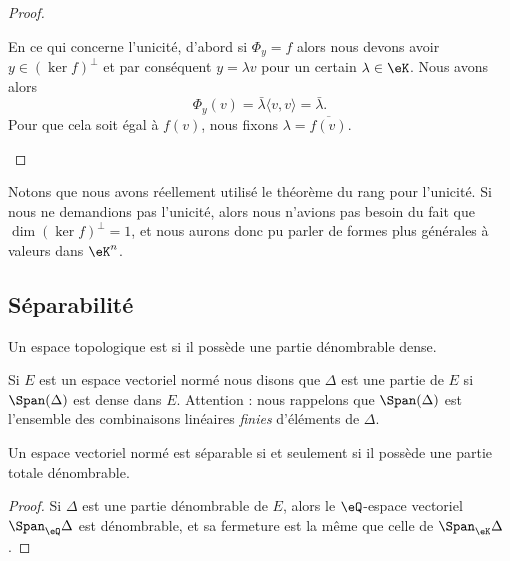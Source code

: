 \begin{proof}
\begin{subproof}
		\spitem[Unicité]

		En ce qui concerne l'unicité, d'abord si \(  \Phi_y= f\) alors nous devons avoir \( y\in(\ker f)^{\perp}\) et par conséquent \( y=\lambda v\) pour un certain \( \lambda\in \eK\). Nous avons alors
		\begin{equation}
			\Phi_y(v)=\bar\lambda\langle v, v\rangle =\bar\lambda.
		\end{equation}
		Pour que cela soit égal à \(  f(v)\), nous fixons \( \lambda=\overline{  f(v) }\).
	\end{subproof}
\end{proof}
Notons que nous avons réellement utilisé le théorème du rang pour l'unicité. Si nous ne demandions pas l'unicité, alors nous n'avions pas besoin du fait que \( \dim(\ker f)^{\perp}=1\), et nous aurons donc pu parler de formes plus générales à valeurs dans \( \eK^n\).

\subsection{Séparabilité}

\begin{definition}      \label{DEFooSFOJooGICSbT}
	Un espace topologique est  si il possède une partie dénombrable dense.
\end{definition}

\begin{definition}      \label{DEFooQVPHooJaSWyF}
	Si \( E\) est un espace vectoriel normé nous disons que \( \Delta\) est une partie  de \( E\) si \( \Span(\Delta)\) est dense dans \( E\). Attention : nous rappelons que \( \Span(\Delta)\) est l'ensemble des combinaisons linéaires \emph{finies} d'éléments de \( \Delta\).
\end{definition}

\begin{proposition}     \label{PROPooZMWHooVwvNBY}
	Un espace vectoriel normé est séparable si et seulement si il possède une partie totale dénombrable.
\end{proposition}

\begin{proof}
	Si \( \Delta\) est une partie dénombrable de \( E\), alors le \( \eQ\)-espace vectoriel \( \Span_{\eQ}\Delta\) est dénombrable, et sa fermeture est la même que celle de \( \Span_{\eK}\Delta\).
\end{proof}

